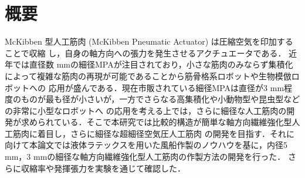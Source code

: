 \newpage
\section*{概要}
McKibben 型人工筋肉 (McKibben Pneumatic Actuator) は圧縮空気を印加することで収縮 し，自身の軸方向への張力を発生させるアクチュエータである．
近年では直径数 mmの細径MPAが注目されており，小さな筋肉のみならず集積化によって複雑な筋肉の再現が可能であることから筋骨格系ロボットや生物模倣ロボットへの
応用が盛んである．現在市販されている細径MPAは直径が3 mm程度のものが最も径が小さいが，一方でさらなる高集積化や小動物型や昆虫型などの非常に小型なロボットへ
の応用を考える上では，さらに細径な人工筋肉の開発が求められている．そこで本研究では比較的構造が簡単な軸方向繊維強化型人工筋肉に着目し，さらに細径な超細径空気圧人工筋肉
の開発を目指す．それに向けて本論文では液体ラテックスを用いた風船作製のノウハウを基に，内径5 mm，3 mmの細径な軸方向繊維強化型人工筋肉の作製方法の開発を行った．
さらに収縮率や発揮張力を実験を通じて確認した．



